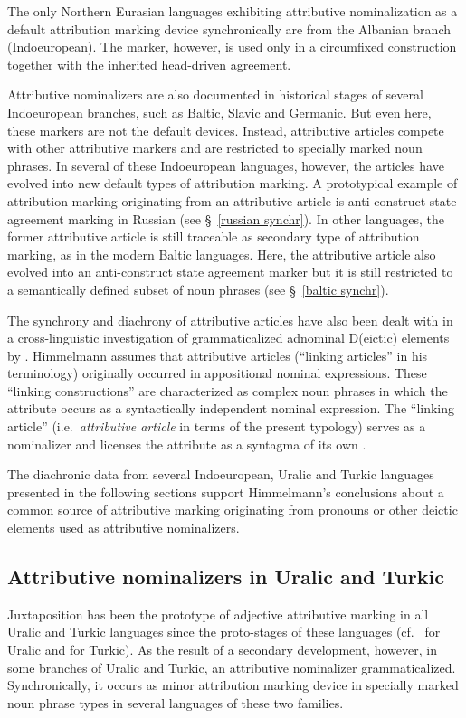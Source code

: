 The only Northern Eurasian languages exhibiting attributive nominalization as a default attribution marking device synchronically are from the Albanian branch (Indoeuropean). The marker, however,  is used only in a circumfixed construction together with the inherited head-driven agreement.

Attributive nominalizers are also documented in historical stages of several Indoeuropean branches, such as Baltic, Slavic and Germanic. But even here, these markers are not the default devices. Instead, attributive articles compete with other attributive markers and are restricted to specially marked noun phrases. In several of these Indoeuropean languages, however, the articles have evolved into new default types of attribution marking. A prototypical example of attribution marking originating from an attributive article is anti-construct state agreement marking in Russian (see \S~\ref{russian synchr}). In other languages, the former attributive article is still traceable as secondary type of attribution marking, as in the modern Baltic languages. Here, the attributive article also evolved into an anti-construct state agreement marker but it is still restricted to a semantically defined subset of noun phrases (see \S~\ref{baltic synchr}). 

The synchrony and diachrony of attributive articles have also been dealt with in a cross-linguistic investigation of grammaticalized adnominal D(eictic) elements by \cite{himmelmann1997}. Himmelmann assumes that attributive articles (“linking articles” in his terminology) originally occurred in appositional nominal expressions. These “linking constructions” are characterized as complex noun phrases in which the attribute occurs as a syntactically independent nominal expression. The “linking article” (i.e.~\textit{attributive article} in terms of the present typology) serves as a nominalizer and licenses the attribute as a syntagma of its own \cite[188]{himmelmann1997}.

The diachronic data from several Indoeuropean, Uralic and Turkic languages presented in the following sections support Himmelmann's conclusions about a common source of attributive marking originating from pronouns or other deictic elements used as attributive nominalizers.

\subsection{Attributive nominalizers in Uralic and Turkic}\label{uralic-turkic diachr}
Juxtaposition has been the prototype of adjective attributive marking in all Uralic and Turkic languages since the proto-stages of these languages (cf.~\citealt[80–81]{decsy1990} for Uralic and \citealt[75–76]{decsy1998} for Turkic). As the result of a secondary development, however, in some branches of Uralic and Turkic, an attributive nominalizer grammaticalized. Synchronically, it occurs as minor attribution marking device in specially marked noun phrase types in several languages of these two families.%

